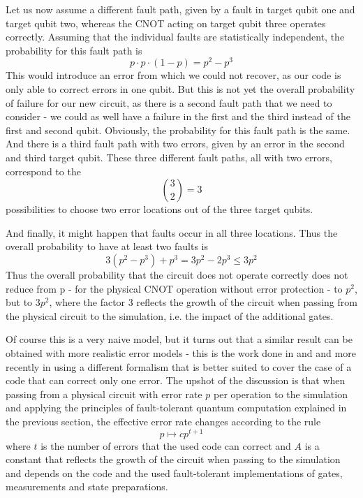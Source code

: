 \documentclass[a4paper, draft]{article}
\theoremstyle{own}
\theoremstyle{remark}
\begin{document}
Let us now assume a different fault path, given by a fault in target qubit one and target qubit two, whereas the CNOT acting on target qubit three operates correctly. Assuming that the individual faults are statistically independent, the probability for this fault path is
$$
p \cdot p \cdot (1 - p) = p^2 - p^3 
$$
This would introduce an error from which we could not recover, as our code is only able to correct errors in one qubit. But this is not yet the overall probability of failure for our new circuit, as there is a second fault path that we need to consider - we could as well have a failure in the first and the third instead of the first and second qubit. Obviously, the probability for this fault path is the same. And there is a third fault path with two errors, given by an error in the second and third target qubit. These three different fault paths, all with two errors, correspond to the 
$$
{{3} \choose {2}} = 3
$$
possibilities to choose two error locations out of the three target qubits. 

And finally, it might happen that faults occur in all three locations. Thus the overall probability to have at least two faults is
$$
3 (p^2 - p^3) + p^3 = 3 p^2 - 2 p^3 \leq 3 p^2
$$
Thus the overall probability that the circuit does not operate correctly does not reduce from p - for the physical CNOT operation without error protection - to $p^2$, but to $3 p^2$, where the factor $3$ reflects the growth of the circuit when passing from the physical circuit to the simulation, i.e. the impact of the additional gates.

Of course this is a very naive model, but it turns out that a similar result can be obtained with more realistic error models - this is the work done in  \cite{AharonovOr} and  \cite{KnillLaflammeZurek} and more recently in \cite{AliferisGottesmanPreskill} using a different formalism that is better suited to cover the case of a code that can correct only one error. The upshot of the discussion is that when passing from a physical circuit with error rate $p$ per operation to the simulation and applying the principles of fault-tolerant quantum computation explained in the previous section, the effective error rate changes according to the rule
$$
p \mapsto c p^{t+1}
$$
where $t$ is the number of errors that the used code can correct and $A$ is a constant that reflects the growth of the circuit when passing to the simulation and depends on the code and the used fault-tolerant implementations of gates, measurements and state preparations.
\end{document}
